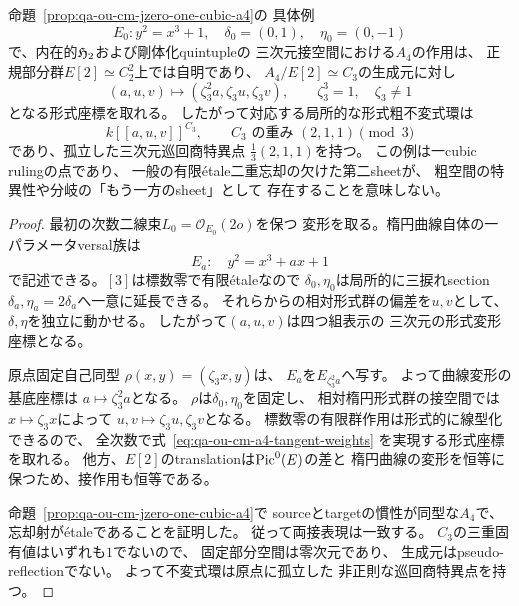 \begin{corollary}[$j=0$の$A_4$点の三次元接表現と粗形式商]
\label{cor:qa-ou-cm-a4-tangent-representation}
命題~\ref{prop:qa-ou-cm-jzero-one-cubic-a4}の
具体例
\[
 E_0:y^2=x^3+1,\quad
 \delta_0=(0,1),\quad\eta_0=(0,-1)
\]
で、内在的$\mathfrak H_2$および剛体化quintupleの
三次元接空間における$A_4$の作用は、
正規部分群$E[2]\simeq C_2^2$上では自明であり、
$A_4/E[2]\simeq C_3$の生成元に対し
\[
 (a,u,v)\longmapsto
   (\zeta_3^2a,\zeta_3u,\zeta_3v),
 \qquad \zeta_3^3=1,\quad\zeta_3\ne1
 \tag{CM-A4-T}\label{eq:qa-ou-cm-a4-tangent-weights}
\]
となる形式座標を取れる。
したがって対応する局所的な形式粗不変式環は
\[
 k[[a,u,v]]^{C_3},\qquad
 C_3\text{ の重み }(2,1,1)\pmod3
 \tag{CM-A4-Q}\label{eq:qa-ou-cm-a4-coarse-invariants}
\]
であり、孤立した三次元巡回商特異点
$\frac13(2,1,1)$を持つ。
この例は一cubic rulingの点であり、
一般の有限étale二重忘却の欠けた第二sheetが、
粗空間の特異性や分岐の「もう一方のsheet」として
存在することを意味しない。
\end{corollary}
\begin{proof}
最初の次数二線束$L_0=\mathcal O_{E_0}(2o)$を保つ
変形を取る。楕円曲線自体の一パラメータversal族は
\[
 E_a:\quad y^2=x^3+ax+1
\]
で記述できる。$[3]$は標数零で有限étaleなので
$\delta_0,\eta_0$は局所的に三捩れsection
$\delta_a,\eta_a=2\delta_a$へ一意に延長できる。
それらからの相対形式群の偏差を$u,v$として、
$\delta,\eta$を独立に動かせる。
したがって$(a,u,v)$は四つ組表示の
三次元の形式変形座標となる。

原点固定自己同型
$\rho(x,y)=(\zeta_3x,y)$は、
$E_a$を$E_{\zeta_3^2a}$へ写す。
よって曲線変形の基底座標は
$a\mapsto\zeta_3^2a$となる。
$\rho$は$\delta_0,\eta_0$を固定し、
相対楕円形式群の接空間では
$x\mapsto\zeta_3x$によって
$u,v\mapsto\zeta_3u,\zeta_3v$となる。
標数零の有限群作用は形式的に線型化できるので、
全次数で式~\eqref{eq:qa-ou-cm-a4-tangent-weights}
を実現する形式座標を取れる。
他方、$E[2]$のtranslationは$\operatorname{Pic}^0(E)$の差と
楕円曲線の変形を恒等に保つため、接作用も恒等である。

命題~\ref{prop:qa-ou-cm-jzero-one-cubic-a4}で
sourceとtargetの慣性が同型な$A_4$で、
忘却射がétaleであることを証明した。
従って両接表現は一致する。
$C_3$の三重固有値はいずれも$1$でないので、
固定部分空間は零次元であり、
生成元はpseudo-reflectionでない。
よって不変式環は原点に孤立した
非正則な巡回商特異点を持つ。
\end{proof}


